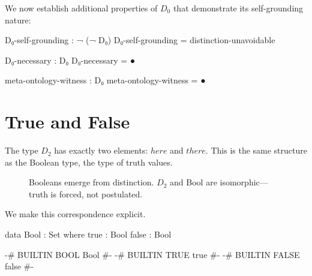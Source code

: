 \documentclass[11pt,a4paper]{book}
\def\texttt#1{#1}%
\def\text#1{#1}%
\begin{document}
We now establish additional properties of $D_0$ that demonstrate its self-grounding nature:

\begin{code}
D₀-self-grounding : ¬ (¬ D₀)
D₀-self-grounding = distinction-unavoidable

D₀-necessary : D₀
D₀-necessary = ●

meta-ontology-witness : D₀
meta-ontology-witness = ●
\end{code}

\chapter{True and False}

The type $D_2$ has exactly two elements: $\text{here}$ and $\text{there}$. 
This is the same structure as the Boolean type, the type of truth values.

\begin{figure}[h]
\centering
{}
\caption{Booleans emerge from distinction. $D_2$ and Bool are isomorphic—truth is forced, not postulated.}
\label{fig:bool-emergence}
\end{figure}

We make this correspondence explicit.

\begin{code}
data Bool : Set where
  true  : Bool
  false : Bool

{-# BUILTIN BOOL  Bool  #-}
{-# BUILTIN TRUE  true  #-}
{-# BUILTIN FALSE false #-}
\end{code}
\end{document}
